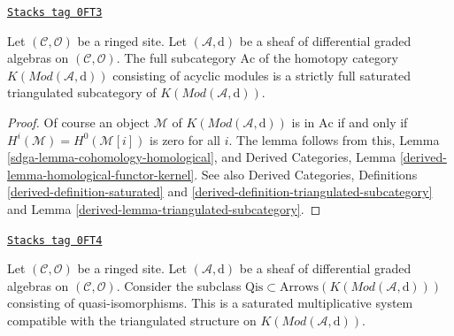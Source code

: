 \begin{lemma}[Acyclics]
\label{sdga-lemma-acyclics}
\href{https://stacks.math.columbia.edu/tag/0FT3}{\texttt{Stacks tag 0FT3}}

Let $(\mathcal{C}, \mathcal{O})$ be a ringed site. Let
$(\mathcal{A}, \text{d})$ be a sheaf of differential graded algebras
on $(\mathcal{C}, \mathcal{O})$. The full subcategory $\text{Ac}$
of the homotopy category $K(\textit{Mod}(\mathcal{A}, \text{d}))$
consisting of acyclic modules is a strictly full saturated
triangulated subcategory of $K(\textit{Mod}(\mathcal{A}, \text{d}))$.
\end{lemma}

\begin{proof}

Of course an object $\mathcal{M}$ of $K(\textit{Mod}(\mathcal{A}, \text{d}))$
is in $\text{Ac}$ if and only if $H^i(\mathcal{M}) = H^0(\mathcal{M}[i])$
is zero for all $i$. The lemma follows from this,
Lemma \ref{sdga-lemma-cohomology-homological}, and
Derived Categories, Lemma \ref{derived-lemma-homological-functor-kernel}.
See also Derived Categories, Definitions \ref{derived-definition-saturated}
and \ref{derived-definition-triangulated-subcategory} and
Lemma \ref{derived-lemma-triangulated-subcategory}.
\end{proof}

\begin{lemma}[Qis]
\label{sdga-lemma-qis}
\href{https://stacks.math.columbia.edu/tag/0FT4}{\texttt{Stacks tag 0FT4}}

Let $(\mathcal{C}, \mathcal{O})$ be a ringed site. Let
$(\mathcal{A}, \text{d})$ be a sheaf of differential graded algebras
on $(\mathcal{C}, \mathcal{O})$.
Consider the subclass
$\text{Qis} \subset \text{Arrows}(K(\textit{Mod}(\mathcal{A}, \text{d})))$
consisting of quasi-isomorphisms. This is a saturated multiplicative
system compatible with the triangulated structure on
$K(\textit{Mod}(\mathcal{A}, \text{d}))$.
\end{lemma}

